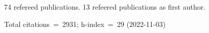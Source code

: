 74 refereed publications. 13 refeered publications as first author.

Total citations~=~2931; h-index~=~29 (2022-11-03)